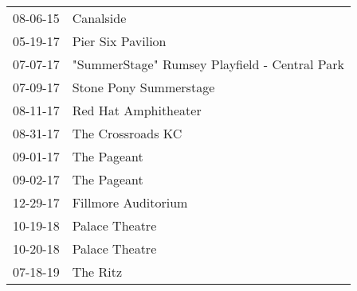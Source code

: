 \begin{supertabular}{p{0.07\textwidth}p{0.23\textwidth}}
 08-06-15 &                                      Canalside \\
 05-19-17 &                              Pier Six Pavilion \\
 07-07-17 &  "SummerStage" Rumsey Playfield - Central Park \\
 07-09-17 &                         Stone Pony Summerstage \\
 08-11-17 &                           Red Hat Amphitheater \\
 08-31-17 &                              The Crossroads KC \\
 09-01-17 &                                    The Pageant \\
 09-02-17 &                                    The Pageant \\
 12-29-17 &                            Fillmore Auditorium \\
 10-19-18 &                                 Palace Theatre \\
 10-20-18 &                                 Palace Theatre \\
 07-18-19 &                                       The Ritz \\
\end{supertabular}
